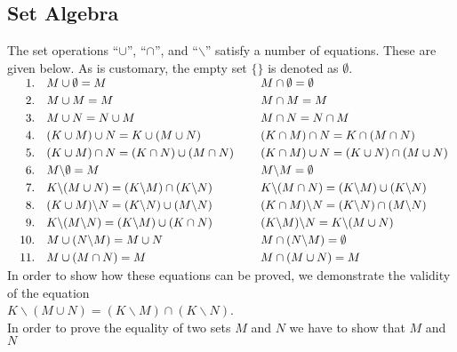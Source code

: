 \subsection{Set Algebra}
The set operations ``$\cup$'', ``$\cap$'', and ``$\backslash$'' satisfy a number of equations. 
 These are given below.  As is customary,  the empty set  $\{\}$ is denoted as $\emptyset$. 
\\[0.2cm]
$\begin{array}{rlcl}
\quad 1. & M \cup \emptyset = M         & \hspace*{0.1cm} & M \cap \emptyset = \emptyset \\[0.1cm]
2. & M \cup M = M         & \hspace*{0.1cm} & M \cap M = M          \\[0.1cm]
3. & M \cup N = N \cup M  &  & M \cap N = N \cap M  \\[0.1cm]
4. & (K \cup M) \cup N = K \cup (M \cup N) &  & (K \cap M) \cap N = K \cap (M \cap N) \\[0.1cm]
5. & (K \cup M) \cap N = (K \cap N) \cup (M \cap N) &  & (K \cap M) \cup N = (K \cup N) \cap (M \cup N)  \\[0.1cm]
6. & M \backslash \emptyset = M & & M \backslash M = \emptyset \\[0.1cm]
7. & K \backslash (M \cup N) = (K \backslash M) \cap (K \backslash N) &&
     K \backslash (M \cap N) = (K \backslash M) \cup (K \backslash N) \\[0.1cm]
8. & (K \cup M) \backslash N = (K \backslash N) \cup (M \backslash N) &&
     (K \cap M) \backslash N = (K \backslash N) \cap (M \backslash N) \\[0.1cm]
9. & K \backslash (M \backslash N) = (K \backslash M) \cup (K \cap N) &&
     (K \backslash M) \backslash N = K \backslash (M \cup N) \\[0.1cm]
10. & M \cup (N \backslash M) = M \cup N &&
      M \cap (N \backslash M) = \emptyset  \\[0.1cm]
11. & M \cup (M \cap N) = M  &&
      M \cap (M \cup N) = M 

\end{array}$
\\[0.3cm]
In order to show how these equations can be proved,  we demonstrate the validity of the
equation 
\\[0.2cm]
\hspace*{1.3cm}
 $K \backslash (M \cup N) = (K \backslash M) \cap (K \backslash N)$.
\\[0.2cm]
In order to prove the equality of two sets $M$ and $N$ we have to show that $M$ and $N$
